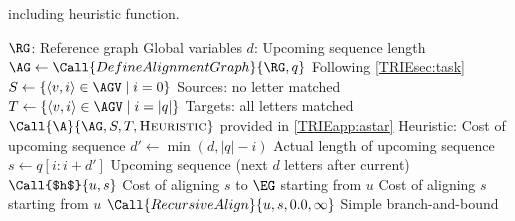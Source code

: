 \begin{algorithm}[t]
	\caption{\astarix including heuristic function.}\label{TRIEalg:astarix}
	\begin{algorithmic}[1]
		\State $\RG$: Reference graph \label{TRIElin:reference}
		\Comment Global variables
		\State $d$: Upcoming sequence length \label{TRIElin:d}
		\Statex
		 \label{TRIElin:astarix}
			\State $\AG \gets \Call{DefineAlignmentGraph}{\RG, q}$
			\Comment Following \cref{TRIEsec:task}
			\State $S \gets \{\langle v,i \rangle \in \AGV \mid i=0 \}$ \label{TRIElin:starts}
			\Comment Sources: no letter matched
			\State $T \gets \{\langle v,i \rangle \in \AGV \mid i=|q| \}$
			\Comment Targets: all letters matched
			\State \Return $\Call{\A}{\AG, S, T, \textsc{Heuristic}}$
			\Comment \A provided in \cref{TRIEapp:astar} \label{TRIElin:ret}
		\EndFunction
		\Statex
		 \label{TRIElin:heuristic-start}
		\Comment Heuristic: Cost of upcoming sequence
			\State $d' \gets \min(d, |q|-i)$
			\Comment Actual length of upcoming sequence
			\State $s \gets q[i:i+d']$ \label{TRIElin:s}
			\Comment Upcoming sequence (next $d$ letters after current)
			\State \Return $\Call{$h$}{u, s}$
			\label{TRIElin:align-upcoming}
			\Comment Cost of aligning $s$ to $\EG$ starting from $u$
		\EndFunction \label{TRIElin:heuristic-end}
		\Statex
		\Comment Cost of aligning $s$ starting from $u$
			\State \Return $\Call{RecursiveAlign}{u, s, 0.0, \infty}$
			\Comment Simple branch-and-bound \label{TRIElin:recursive-align}
		\EndFunction
	\end{algorithmic}
\end{algorithm}